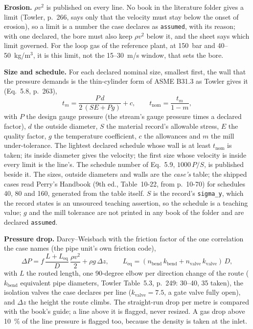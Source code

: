 \documentclass[11pt,a4paper]{article}
\begin{document}
\textbf{Erosion.} $\rho v^2$ is published on every line. No book in the
literature folder gives a limit (Towler, p.~266, says only that the
velocity must stay below the onset of erosion), so a limit is a number
the case declares as \texttt{assumed}, with its reason; with one
declared, the bore must also keep $\rho v^2$ below it, and the sheet says
which limit governed. For the loop gas of the reference plant, at 150~bar
and 40--50~kg/m$^3$, it is this limit, not the 15--30~m/s window, that
sets the bore.

\textbf{Size and schedule.} For each declared nominal size, smallest
first, the wall that the pressure demands is the thin-cylinder form of
ASME B31.3 as Towler gives it (Eq.~5.8, p.~263),
\begin{equation}
t_m = \frac{P\,d}{2\,(S E + P g)} + c, \qquad
t_\mathrm{nom} = \frac{t_m}{1 - m},
\end{equation}
with $P$ the design gauge pressure (the stream's gauge pressure times a
declared factor), $d$ the outside diameter, $S$ the material record's
allowable stress, $E$ the quality factor, $g$ the temperature
coefficient, $c$ the allowances and $m$ the mill under-tolerance. The
lightest declared schedule whose wall is at least $t_\mathrm{nom}$ is
taken; its inside diameter gives the velocity; the first size whose
velocity is inside every limit is the line's. The schedule number of
Eq.~5.9, $1000\,P/S$, is published beside it. The sizes, outside
diameters and walls are the \emph{case's} table; the shipped cases read
Perry's Handbook (9th ed., Table~10-22, from p.~10-70) for schedules 40,
80 and 160, generated from the table itself. $S$ is the record's
\texttt{sigma\_y}, which the record states is an unsourced teaching
assertion, so the schedule is a teaching value; $g$ and the mill
tolerance are not printed in any book of the folder and are declared
\texttt{assumed}.

\textbf{Pressure drop.} Darcy--Weisbach with the friction factor of the
one correlation the case names (the pipe unit's own friction code),
\begin{equation}
\Delta P = f\,\frac{L + L_\mathrm{eq}}{D}\,\frac{\rho v^2}{2}
 + \rho g\,\Delta z, \qquad
L_\mathrm{eq} = (n_\mathrm{bend}\,k_\mathrm{bend} + n_\mathrm{valve}\,k_\mathrm{valve})\,D,
\end{equation}
with $L$ the routed length, one 90-degree elbow per direction change of
the route ($k_\mathrm{bend}$ equivalent pipe diameters, Towler Table~5.3,
p.~249: 30--40, 35 taken), the isolation valves the case declares per
line ($k_\mathrm{valve} = 7.5$, a gate valve fully open), and $\Delta z$
the height the route climbs. The straight-run drop per metre is compared
with the book's guide; a line above it is flagged, never resized. A gas
drop above 10~\% of the line pressure is flagged too, because the density
is taken at the inlet.
\end{document}
